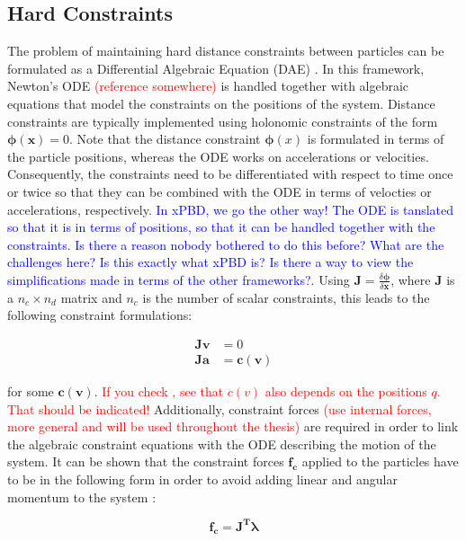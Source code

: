 \subsection{Hard Constraints}\label{ss:hard-constraints}
The problem of maintaining hard distance constraints between particles can be formulated as a Differential Algebraic Equation (DAE)
\cite{ascher1995, baraff1996}. In this framework, Newton's ODE \textcolor{red}{(reference somewhere)} is handled together with 
algebraic equations that model the constraints on the positions of the system. Distance constraints are typically implemented using 
holonomic constraints 
of the form $\bm{\phi(x)} = 0$. Note that the distance constraint $\bm{\phi}(x)$ is formulated in terms of the particle positions, 
whereas the ODE works on accelerations or velocities. Consequently, the constraints need to be differentiated with respect to time
once or twice so that they can be 
combined with the ODE in terms of velocties or accelerations, respectively. \textcolor{blue}{In xPBD, we go the other way! The ODE
is tanslated so that it is in terms of positions, so that it can be handled together with the constraints. Is there a reason nobody 
bothered to
do this before? What are the challenges here? Is this exactly what xPBD is? Is there a way to view the simplifications made in 
terms of the other frameworks?}. Using $\bm{J} = \frac{\delta \bm{\phi}}{\delta \bm{x}}$, where $\bm{J}$ is a $n_c \times n_d$ matrix
and $n_c$ is the number of scalar constraints, this leads to the following constraint formulations:

\begin{align*}
    \bm{Jv} &= 0 \\
    \bm{Ja} &= \bm{c(v)}
\end{align*}

for some $\bm{c(v)}$. \textcolor{red}{If you check \cite{ascher1995}, see that $c(v)$ also depends on the positions $q$. That should 
be indicated!} 
Additionally, constraint forces \textcolor{red}{(use internal forces, more general and will be used throughout the thesis)} are 
required in order to link the algebraic constraint equations with the ODE describing the motion of 
the system. It can be shown that the constraint forces $\bm{f_c}$ applied to the particles have to be in the following form in order to 
avoid adding linear and angular momentum to the system \cite{baraff1996}:

\begin{equation}\label{eq:constraint-forces}
    \bm{f_c} = \bm{J^T \lambda}
\end{equation}

